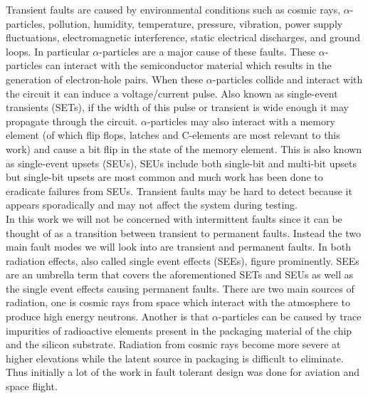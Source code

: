 \documentclass[12pt]{report}
\begin{document}
Transient faults are caused by environmental conditions such as cosmic rays, $\alpha$-particles, pollution, humidity, temperature, pressure, vibration, power supply fluctuations, electromagnetic interference, static electrical discharges, and ground loops.  In particular $\alpha$-particles are a major cause of these faults.  These $\alpha$-particles can interact with the semiconductor material which results in the generation of electron-hole pairs. When these $\alpha$-particles collide and interact with the circuit it can induce a voltage/current pulse.  Also known as single-event transients (SETs), if the width of this pulse or transient is wide enough it may propagate through the circuit.  $\alpha$-particles may also interact with a memory element (of which flip flops, latches and C-elements are most relevant to this work) and cause a bit flip in the state of the memory element. This is also known as single-event upsets (SEUs), SEUs include both single-bit and multi-bit upsets but single-bit upsets are most common and much work has been done to eradicate failures from SEUs.  
Transient faults may be hard to detect because it appears sporadically and may not affect the system during testing. \\

In this work we will not be concerned with intermittent faults since it can be thought of as a transition between transient to permanent faults.  Instead the two main fault modes we will look into are transient and permanent faults.  In both radiation effects, also called single event effects (SEEs), figure prominently.  SEEs are an umbrella term that covers the aforementioned SETs and SEUs as well as the single event effects causing permanent faults.  There are two main sources of radiation, one is cosmic rays from space which interact with the atmosphere to produce high energy neutrons.  Another is that $\alpha$-particles can be caused by trace impurities of radioactive elements present in the packaging material of the chip and the silicon substrate.  Radiation from cosmic rays become more severe at higher elevations while the latent source in packaging is difficult to eliminate.  Thus initially a lot of the work in fault tolerant design was done for aviation and space flight.


\end{document}
